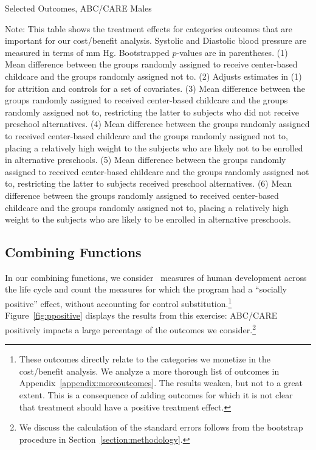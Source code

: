 \begin{table}[H]
\centering
\begin{threeparttable}
\caption{Selected Outcomes, ABC/CARE Males}\label{resultsmales}
\begin{scriptsize}

\end{scriptsize}
\begin{tablenotes}
\footnotesize
\item Note: This table shows the treatment effects for categories outcomes that are important for our cost/benefit analysis. Systolic and Diastolic blood pressure are measured in terms of mm Hg. Bootstrapped $p$-values are in parentheses. (1) Mean difference between the groups randomly assigned to receive center-based childcare and the groups randomly assigned not to. (2) Adjusts estimates in (1) for attrition and controls for a set of covariates. (3) Mean difference between the groups randomly assigned to received center-based childcare and the groups randomly assigned not to, restricting the latter to subjects who did not receive preschool alternatives. (4) Mean difference between the groups randomly assigned to received center-based childcare and the groups randomly assigned not to, placing a relatively high weight to the subjects who are likely not to be enrolled in alternative preschools. (5) Mean difference between the groups randomly assigned to received center-based childcare and the groups randomly assigned not to, restricting the latter to subjects received preschool alternatives. (6) Mean difference between the groups randomly assigned to received center-based childcare and the groups randomly assigned not to, placing a relatively high weight to the subjects who are likely to be enrolled in alternative preschools.
\end{tablenotes}
\end{threeparttable}
\end{table}

\subsection{Combining Functions} \label{section:c-functions}

In our combining functions, we consider \noutcomes\ measures of human development across the life cycle and count the measures for which the program had a ``socially positive'' effect, without accounting for control substitution.\footnote{These outcomes directly relate to the categories we monetize in the cost/benefit analysis. We analyze a more thorough list of outcomes in Appendix~\ref{appendix:moreoutcomes}. The results weaken, but not to a great extent. This is a consequence of adding outcomes for which it is not clear that treatment should have a positive treatment effect.} Figure~\ref{fig:ppositive} displays the results from this exercise: ABC/CARE positively impacts a large percentage of the outcomes we consider.\footnote{We discuss the calculation of the standard errors follows from the bootstrap procedure in Section~\ref{section:methodology}.}

